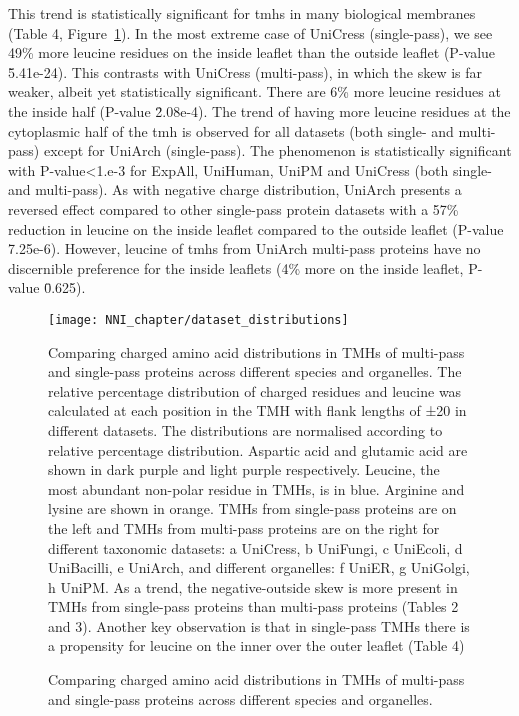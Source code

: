 This trend is statistically significant for \gls{tmh}s in many biological membranes (Table 4, Figure~\ref{fig:dataset_distributions}). In the most extreme case of UniCress (single-pass), we see 49\% more leucine residues on the inside leaflet than the outside leaflet (P-value \= 5.41e-24). This contrasts with UniCress (multi-pass), in which the skew is far weaker, albeit yet statistically significant. There are 6\% more leucine residues at the inside half (P-value \= 2.08e-4). The trend of having more leucine residues at the cytoplasmic half of the \gls{tmh} is observed for all datasets (both single- and multi-pass) except for UniArch (single-pass). The phenomenon is statistically significant with P-value<1.e-3 for ExpAll, UniHuman, UniPM and UniCress (both single- and multi-pass). As with negative charge distribution, UniArch presents a reversed effect compared to other single-pass protein datasets with a 57\% reduction in leucine on the inside leaflet compared to the outside leaflet (P-value \= 7.25e-6). However, leucine of \gls{tmh}s from UniArch multi-pass proteins have no discernible preference for the inside leaflets (4\% more on the inside leaflet, P-value \= 0.625).

\begin{figure}[!ht]
\centering
\texttt{[image: NNI\_chapter/dataset\_distributions]}
\caption{Comparing charged amino acid distributions in TMHs of multi-pass and single-pass proteins across different species and organelles. }
\medskip
\justify
\small
Comparing charged amino acid distributions in TMHs of multi-pass and single-pass proteins across different species and organelles. The relative percentage distribution of charged residues and leucine was calculated at each position in the TMH with flank lengths of ±20 in different datasets. The distributions are normalised according to relative percentage distribution. Aspartic acid and glutamic acid are shown in dark purple and light purple respectively. Leucine, the most abundant non-polar residue in TMHs, is in blue. Arginine and lysine are shown in orange. TMHs from single-pass proteins are on the left and TMHs from multi-pass proteins are on the right for different taxonomic datasets: a UniCress, b UniFungi, c UniEcoli, d UniBacilli, e UniArch, and different organelles: f UniER, g UniGolgi, h UniPM. As a trend, the negative-outside skew is more present in TMHs from single-pass proteins than multi-pass proteins (Tables 2 and 3). Another key observation is that in single-pass TMHs there is a propensity for leucine on the inner over the outer leaflet (Table 4)
\label{fig:dataset_distributions}
\end{figure}

